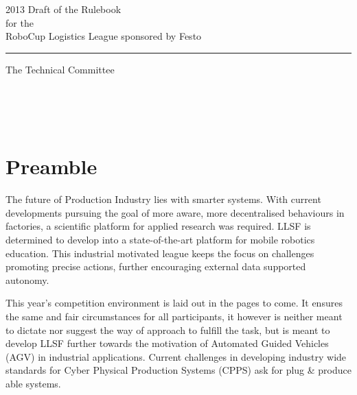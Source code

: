 \documentclass[12pt,twoside]{article}
\begin{document}


\begin{titlepage}
  \vspace*{5cm}
  \begin{center}
    \begin{LARGE}
      2013 Draft of the Rulebook\\[2ex]
      for the\\[2ex]
      RoboCup Logistics League sponsored by Festo\\[4ex]
    \end{LARGE}
    \hrule
    
    \vspace*{4ex}
    \begin{Large}
      The Technical Committee\\[6ex]
    \end{Large}
  \end{center}
  \vspace*{4cm}
  
  \noindent
  \\[2ex]
  \\[2ex]
  \\[2ex]  
\end{titlepage}
\thispagestyle{empty}
\pagebreak
\cleardoublepage

\setcounter{page}{1}
\tableofcontents
\newpage
\cleardoublepage


\setcounter{page}{1}


\section*{Preamble}

The future of Production Industry lies with smarter systems.  With
current developments pursuing the goal of more aware, more
decentralised behaviours in factories, a scientific platform for
applied research was required.  LLSF is determined to develop into a
state-of-the-art platform for mobile robotics education. This
industrial motivated league keeps the focus on challenges promoting
precise actions, further encouraging external data supported autonomy.

This year’s competition environment is laid out in the pages to come.
It ensures the same and fair circumstances for all participants, it
however is neither meant to dictate nor suggest the way of approach to
fulfill the task, but is meant to develop LLSF further towards the
motivation of Automated Guided Vehicles (AGV) in industrial
applications. Current challenges in developing industry wide standards
for Cyber Physical Production Systems (CPPS) ask for plug \& produce
able systems.
\end{document}
